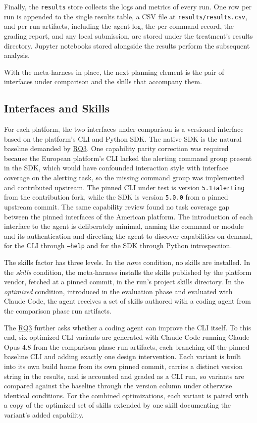 \documentclass[
english,                 %
bibtex,                  %
]{kththesis}
\numberwithin{listing}{chapter}
\begin{document}
Finally, the \texttt{results} store collects the logs and metrics of every run. One row per run is appended to the single results table, a \gls{CSV} file at \texttt{results/results.csv}, and per run artifacts, including the agent log, the per command record, the grading report, and any local submission, are stored under the treatment's results directory. Jupyter notebooks stored alongside the results perform the subsequent analysis.

With the meta-harness in place, the next planning element is the pair of interfaces under comparison and the skills that accompany them.

\subsection{Interfaces and Skills}
\label{sec:method_interfaces_and_skills}
\glsresetall

For each platform, the two interfaces under comparison is a versioned interface based on the platform's \gls{CLI} and Python \gls{SDK}. The native \gls{SDK} is the natural baseline demanded by \hyperref[rq3]{RQ3}. One capability parity correction was required because the European platform's \gls{CLI} lacked the alerting command group present in the \gls{SDK}, which would have confounded interaction style with interface coverage on the alerting task, so the missing command group was implemented and contributed upstream. The pinned \gls{CLI} under test is version \texttt{5.1+alerting} from the contribution fork, while the \gls{SDK} is version \texttt{5.0.0} from a pinned upstream commit. The same capability review found no task coverage gap between the pinned interfaces of the American platform. The introduction of each interface to the agent is deliberately minimal, naming the command or module and its authentication and directing the agent to discover capabilities on-demand, for the \gls{CLI} through \texttt{--help} and for the \gls{SDK} through Python introspection.

The skills factor has three levels. In the \emph{none} condition, no skills are installed. In the \emph{skills} condition, the meta-harness installs the skills published by the platform vendor, fetched at a pinned commit, in the run's project skills directory. In the \emph{optimized} condition, introduced in the evaluation phase and evaluated with Claude Code, the agent receives a set of skills authored with a coding agent from the comparison phase run artifacts.

The \hyperref[rq3]{RQ3} further asks whether a coding agent can improve the \gls{CLI} itself. To this end, six optimized \gls{CLI} variants are generated with Claude Code running Claude Opus 4.8 from the comparison phase run artifacts, each branching off the pinned baseline \gls{CLI} and adding exactly one design intervention. Each variant is built into its own build home from its own pinned commit, carries a distinct version string in the results, and is accounted and graded as a \gls{CLI} run, so variants are compared against the baseline through the version column under otherwise identical conditions. For the combined optimizations, each variant is paired with a copy of the optimized set of skills extended by one skill documenting the variant's added capability.
\end{document}
